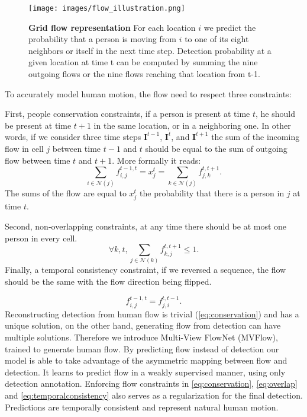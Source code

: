 \documentclass[10pt,twocolumn,letterpaper]{article}
\begin{document}
\begin{figure}
    \centering
      \texttt{[image: images/flow\_illustration.png]}
      \caption{\textbf{ Grid flow representation} For each location $i$ we predict the probability that a person is moving from $i$ to one of its eight neighbors or itself in the next time step.
      Detection probability at a given location at time t can be computed by summing the nine outgoing flows or the nine flows reaching that location from t-1.
      \label{fig:gridworld}
      }
    \end{figure}
     
To accurately model human motion, the flow need to respect three constraints:

First, people conservation constraints, if a person is present at time $t$, he should be present at time $t+1$ in the same location, 
or in a neighboring one. In other words, if we consider three time steps $\mathbf{I}^{t-1}$, $\mathbf{I}^t$, and $\mathbf{I}^{t+1}$ the sum of the incoming flow in cell $j$ between time $t-1$ and $t$ 
should be equal to the sum of outgoing flow between time $t$ and $t+1$. More formally it reads:
\begin{equation}
    \sum_{i \in \mathcal{N}(j)} f_{i, j}^{t-1, t}=x_{j}^{t}=\sum_{k \in \mathcal{N}(j)} f_{j, k}^{t, t+1}.
\label{eq:conservation}
\end{equation}
The sums of the flow are equal to $x_{j}^{t}$ the probability that there is a person in $j$ at time $t$.

Second, non-overlapping constraints, at any time there should be at most one person in every cell.
\begin{equation}
\forall k, t, \sum_{j \in \mathcal{N}(k)} f_{k, j}^{t,t+1} \leq 1.
\label{eq:overlap}
\end{equation}
Finally, a temporal consistency constraint, if we reversed a sequence, the flow should be the same with the flow direction being flipped.

\begin{equation}
    f_{i, j}^{t-1, t}=f_{j, i}^{t, t-1}.
    \label{eq:temporalconsistency}
\end{equation}
Reconstructing detection from human flow is trivial (\cref{eq:conservation}) and has a unique solution, on the other hand, generating flow from detection can have multiple solutions. Therefore we introduce Multi-View FlowNet (MVFlow), trained to generate human flow.
By predicting flow instead of detection our model is able to take advantage of the asymmetric mapping between flow and detection. It learns to predict flow in a weakly supervised manner, using only detection annotation. 
Enforcing flow constraints in \cref{eq:conservation}, \cref{eq:overlap} and \cref{eq:temporalconsistency} also serves as a regularization for the final detection. Predictions are temporally consistent and represent natural human motion.
\end{document}
